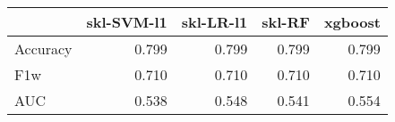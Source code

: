 \begin{tabular}{lrrrr}
\toprule
{} &  skl-SVM-l1 &  skl-LR-l1 &  skl-RF &  xgboost \\
\midrule
Accuracy &       0.799 &      0.799 &   0.799 &    0.799 \\
F1w      &       0.710 &      0.710 &   0.710 &    0.710 \\
AUC      &       0.538 &      0.548 &   0.541 &    0.554 \\
\bottomrule
\end{tabular}
